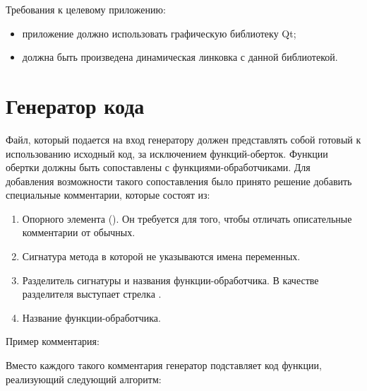 Требования к целевому приложению:

\begin{itemize}
	\item приложение должно использовать графическую библиотеку Qt;
	\item должна быть произведена динамическая линковка с данной библиотекой.
\end{itemize}

\section{Генератор кода}

Файл, который подается на вход генератору должен представлять собой готовый к
использованию исходный код, за исключением функций-оберток. Функции обертки
должны быть сопоставлены с функциями-обработчиками. Для добавления возможности
такого сопоставления было принято решение добавить специальные комментарии,
которые состоят из:

\begin{enumerate}
	\item Опорного элемента (). Он требуется для того, чтобы
		отличать описательные комментарии от обычных.
	\item Сигнатура метода в которой не указываются имена переменных.
	\item Разделитель сигнатуры и названия функции-обработчика. В качестве
		разделителя выступает стрелка \code{->}.
	\item Название функции-обработчика.
\end{enumerate}

Пример комментария: 

Вместо каждого такого комментария генератор подставляет код функции, реализующий
следующий алгоритм:

\begin{algorithm}[H]
\end{algorithm}


